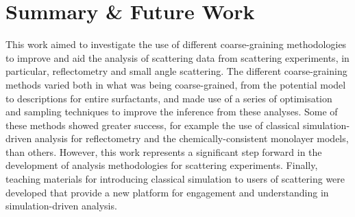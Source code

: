 
\chapter{Summary \& Future Work} %

\label{summary} %


This work aimed to investigate the use of different coarse-graining methodologies to improve and aid the analysis of scattering data from scattering experiments, in particular, reflectometry and small angle scattering.
The different coarse-graining methods varied both in what was being coarse-grained, from the potential model to descriptions for entire surfactants, and made use of a series of optimisation and sampling techniques to improve the inference from these analyses.
Some of these methods showed greater success, for example the use of classical simulation-driven analysis for reflectometry and the chemically-consistent monolayer models, than others. 
However, this work represents a significant step forward in the development of analysis methodologies for scattering experiments.
Finally, teaching materials for introducing classical simulation to users of scattering were developed that provide a new platform for engagement and understanding in simulation-driven analysis.

